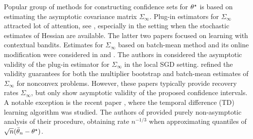 \par 
Popular group of methods for constructing confidence sets for $\theta^\star$ is based on estimating the asymptotic covariance matrix $\Sigma_{\infty}$. Plug-in estimators for $\Sigma_{\infty}$ attracted lot of attention, see  \cite{chen2020aos,chen2021statistical,chen2022online}, especially in the setting when the stochastic estimates of Hessian are available. The latter two papers focused on learning with contextual bandits. Estimates for $\Sigma_{\infty}$ based on batch-mean method and its online modification were considered in \cite{chen2020aos} and \cite{zhu2023online_cov_matr}. The authors in \cite{pmlr-v178-li22b} considered the asymptotic validity of the plug-in estimator for $\Sigma_{\infty}$ in the local SGD setting. \cite{zhong2023online} refined the validity guarantees for both the multiplier bootstrap and batch-mean estimates of $\Sigma_{\infty}$ for nonconvex problems. However, these papers typically provide recovery rates $\Sigma_{\infty}$, but only show asymptotic validity of the proposed confidence intervals. A notable exception is the recent paper \cite{wu2024statistical}, where the temporal difference (TD) learning algorithm was studied. The authors of \cite{wu2024statistical} provided purely non-asymptotic analysis of their procedure, obtaining rate $n^{-1/3}$ when approximating quantiles of $\sqrt{n}(\bar{\theta}_n - \theta^\star)$. 





